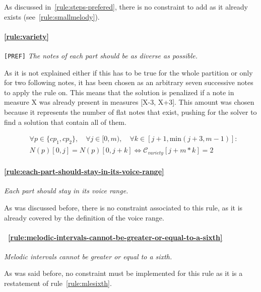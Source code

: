 As discussed in~\ref{rule:steps-prefered}, there is no constraint to add as it already exists (see~\ref{rule:smallmelody}).

\paragraph{\hspace{.6cm}\ref{rule:variety}} \texttt{[PREF]}  \textit{The notes of each part should be as diverse as possible.}

    As it is not explained either if this has to be true for the whole partition or only for two following notes, it has been chosen as an arbitrary seven successive notes to apply the rule on. This means that the solution is penalized if a note in measure X was already present in measures [X-3, X+3]. This amount was chosen because it represents the number of flat notes that exist, pushing for the solver to find a solution that contain all of them.

    \begin{equation} \begin{aligned}
    &\forall p \in \{cp_1, cp_2\}, \quad \forall j \in [0, m), \quad \forall k \in [j+1, \text{min} (j+3, m-1)] :\\ 
    &N(p)[0, j] = N(p)[0, j+k]\iff \mathcal{C}_{variety}[j+m*k]= 2
    \end{aligned} \end{equation}

    \paragraph{\hspace{.6cm}\ref{rule:each-part-should-stay-in-its-voice-range}}  \textit{Each part should stay in its voice range.}

    As was discussed before, there is no constraint associated to this rule, as it is already covered by the definition of the voice range.

    \paragraph{\hspace{0.6cm}~\ref{rule:melodic-intervals-cannot-be-greater-or-equal-to-a-sixth}}  \textit{Melodic intervals cannot be greater or equal to a sixth.}

    As was said before, no constraint must be implemented for this rule as it is a restatement of rule~\ref{rule:mlesixth}.

